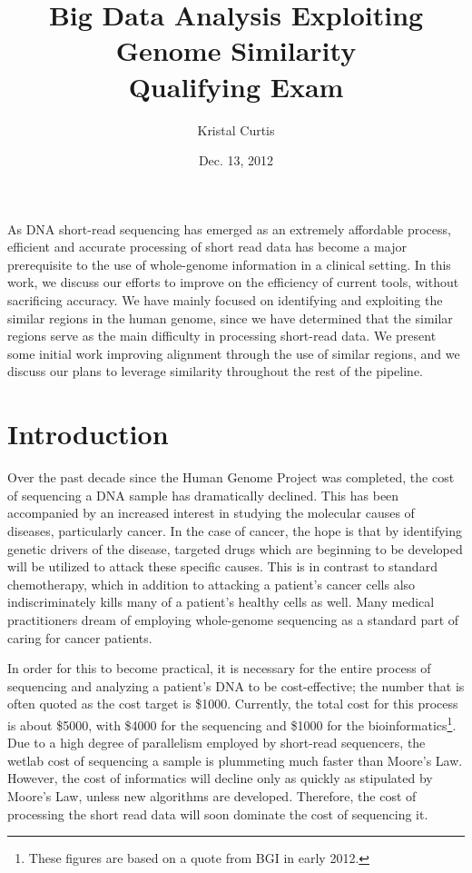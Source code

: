 \documentclass[twocolumn,10pt]{article}
\begin{document}
\title{Big Data Analysis Exploiting Genome Similarity\\ Qualifying Exam}
\author{Kristal Curtis}
\date{Dec. 13, 2012}
\maketitle

\abstract

As DNA short-read sequencing has emerged as an extremely affordable process, efficient and accurate processing of short read data has become a major prerequisite to the use of whole-genome information in a clinical setting.  In this work, we discuss our efforts to improve on the efficiency of current tools, without sacrificing accuracy.  We have mainly focused on identifying and exploiting the similar regions in the human genome, since we have determined that the similar regions serve as the main difficulty in processing short-read data.  We present some initial work improving alignment through the use of similar regions, and we discuss our plans to leverage similarity throughout the rest of the pipeline.

\section{Introduction} 

Over the past decade since the Human Genome Project was completed, the cost of sequencing a DNA sample has dramatically declined.  This has been accompanied by an increased interest in studying the molecular causes of diseases, particularly cancer.  In the case of cancer, the hope is that by identifying genetic drivers of the disease, targeted drugs which are beginning to be developed will be utilized to attack these specific causes.  This is in contrast to standard chemotherapy, which in addition to attacking a patient's cancer cells also indiscriminately kills many of a patient's healthy cells as well.  Many medical practitioners dream of employing whole-genome sequencing as a standard part of caring for cancer patients.

In order for this to become practical, it is necessary for the entire process of sequencing and analyzing a patient's DNA to be cost-effective; the number that is often quoted as the cost target is \$1000.  Currently, the total cost for this process is about \$5000, with \$4000 for the sequencing and \$1000 for the bioinformatics\footnote{These figures are based on a quote from BGI in early 2012.}.  Due to a high degree of parallelism employed by short-read sequencers, the wetlab cost of sequencing a sample is plummeting much faster than Moore's Law.  However, the cost of informatics will decline only as quickly as stipulated by Moore's Law, unless new algorithms are developed.  Therefore, the cost of processing the short read data will soon dominate the cost of sequencing it.
\end{document}
